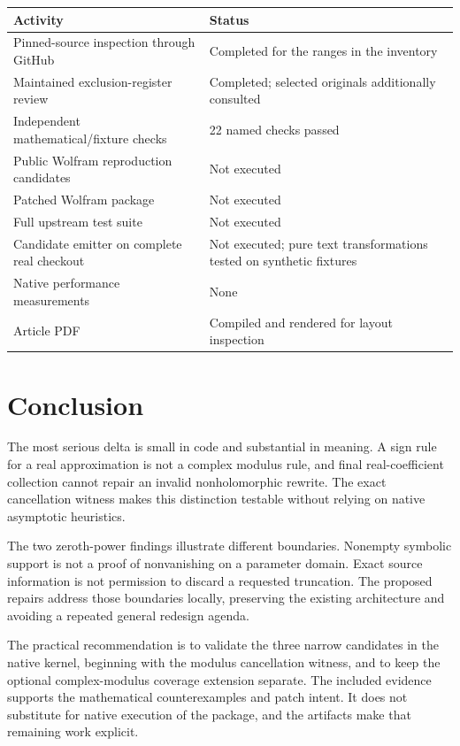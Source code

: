 \documentclass[11pt,letterpaper]{article}
\begin{document}
\begin{tabularx}{\textwidth}{@{}p{2.6in}X@{}}
\toprule
Activity & Status\\
\midrule
Pinned-source inspection through GitHub & Completed for the ranges in the inventory\\
Maintained exclusion-register review & Completed; selected originals additionally consulted\\
Independent mathematical/fixture checks & 22 named checks passed\\
Public Wolfram reproduction candidates & Not executed\\
Patched Wolfram package & Not executed\\
Full upstream test suite & Not executed\\
Candidate emitter on complete real checkout & Not executed; pure text transformations tested on synthetic fixtures\\
Native performance measurements & None\\
Article PDF & Compiled and rendered for layout inspection\\
\bottomrule
\end{tabularx}

\section{Conclusion}

The most serious delta is small in code and substantial in meaning. A sign rule for a real approximation is not a complex modulus rule, and final real-coefficient collection cannot repair an invalid nonholomorphic rewrite. The exact cancellation witness makes this distinction testable without relying on native asymptotic heuristics.

The two zeroth-power findings illustrate different boundaries. Nonempty symbolic support is not a proof of nonvanishing on a parameter domain. Exact source information is not permission to discard a requested truncation. The proposed repairs address those boundaries locally, preserving the existing architecture and avoiding a repeated general redesign agenda.

The practical recommendation is to validate the three narrow candidates in the native kernel, beginning with the modulus cancellation witness, and to keep the optional complex-modulus coverage extension separate. The included evidence supports the mathematical counterexamples and patch intent. It does not substitute for native execution of the package, and the artifacts make that remaining work explicit.
\end{document}
